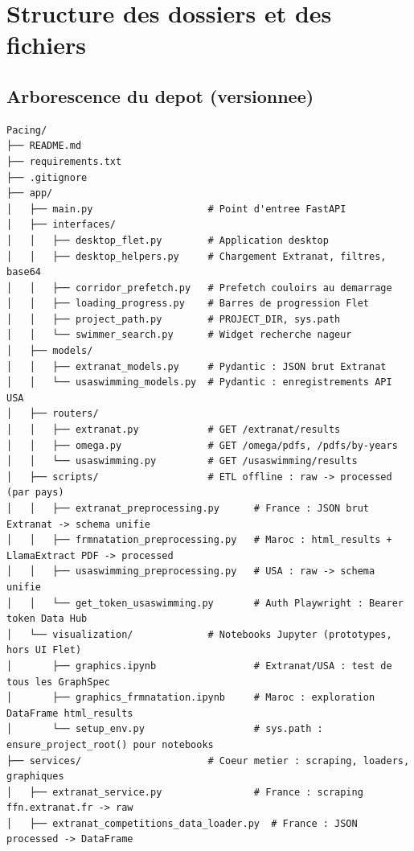 \documentclass[11pt,a4paper]{article}
\begin{document}
\section{Structure des dossiers et des fichiers}

\subsection{Arborescence du depot (versionnee)}

\begin{lstlisting}
Pacing/
├── README.md
├── requirements.txt
├── .gitignore
├── app/
│   ├── main.py                    # Point d'entree FastAPI
│   ├── interfaces/
│   │   ├── desktop_flet.py        # Application desktop 
│   │   ├── desktop_helpers.py     # Chargement Extranat, filtres, base64
│   │   ├── corridor_prefetch.py   # Prefetch couloirs au demarrage
│   │   ├── loading_progress.py    # Barres de progression Flet
│   │   ├── project_path.py        # PROJECT_DIR, sys.path
│   │   └── swimmer_search.py      # Widget recherche nageur
│   ├── models/
│   │   ├── extranat_models.py     # Pydantic : JSON brut Extranat
│   │   └── usaswimming_models.py  # Pydantic : enregistrements API USA
│   ├── routers/
│   │   ├── extranat.py            # GET /extranat/results
│   │   ├── omega.py               # GET /omega/pdfs, /pdfs/by-years
│   │   └── usaswimming.py         # GET /usaswimming/results
│   ├── scripts/                   # ETL offline : raw -> processed (par pays)
│   │   ├── extranat_preprocessing.py      # France : JSON brut Extranat -> schema unifie
│   │   ├── frmnatation_preprocessing.py   # Maroc : html_results + LlamaExtract PDF -> processed
│   │   ├── usaswimming_preprocessing.py   # USA : raw -> schema unifie
│   │   └── get_token_usaswimming.py       # Auth Playwright : Bearer token Data Hub
│   └── visualization/             # Notebooks Jupyter (prototypes, hors UI Flet)
│       ├── graphics.ipynb                 # Extranat/USA : test de tous les GraphSpec
│       ├── graphics_frmnatation.ipynb     # Maroc : exploration DataFrame html_results
│       └── setup_env.py                   # sys.path : ensure_project_root() pour notebooks
├── services/                      # Coeur metier : scraping, loaders, graphiques
│   ├── extranat_service.py                # France : scraping ffn.extranat.fr -> raw
│   ├── extranat_competitions_data_loader.py  # France : JSON processed -> DataFrame

\end{lstlisting}
\end{document}
